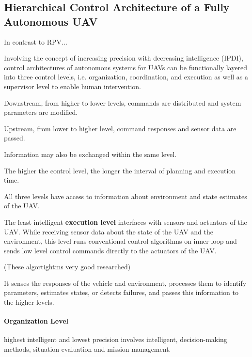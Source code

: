 \subsection{Hierarchical Control Architecture of a Fully Autonomous UAV}

In contrast to RPV...

Involving the concept of 
increasing precision with decreasing intelligence (IPDI),
control architectures of autonomous systems for UAVs 
can be functionally layered
into three control levels, i.e.
organization, coordination, and execution
as well as a supervisor level
to enable human intervention.

Downstream, from higher to lower levels,
commands are distributed and
system parameters are modified.

Upstream, from lower to higher level,
command responses and sensor data
are passed.

Information may also be exchanged within the same level.

The higher the control level,
the longer the interval of planning and execution time.



All three levels have access to
information about 
environment and state estimates of the UAV.

The least intelligent \textbf{execution level}
interfaces with sensors and actuators
of the UAV. While receiving sensor data about
the state of the UAV and the environment,
this level runs conventional  control  algorithms 
on inner-loop and sends low level control
commands directly to the actuators of the UAV.



(These algortightms very good researched)




It  senses  the  responses  of  the  vehicle  and  environment,    
processes    them    to    identify    parameters,    
estimates   states,   or   detects   failures,   
and   passes   this   information to the higher levels.


\paragraph{Organization Level}

highest   intelligent    and    lowest    precision
involves    intelligent,    decision-making  methods,  
situation  evaluation  and  mission  management. 




